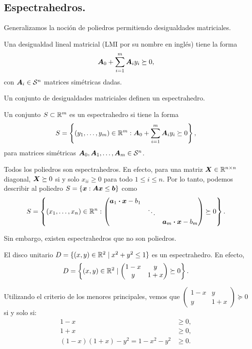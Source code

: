 \subsection{Espectrahedros.} Generalizamos la noción de poliedros permitiendo desigualdades matriciales.

\begin{definition}
  Una desigualdad lineal matricial (LMI por su nombre en inglés) tiene la forma
  $$\bm{A}_0 + \sum_{i = 1}^m \bm{A}_i y_i \succeq 0,$$
  con $\bm{A}_i \in {\mathcal S}^n$ matrices simétricas dadas.
\end{definition}

Un conjunto de desigualdades matriciales definen un espectrahedro.

\begin{definition}
Un conjunto $S \subset \mathbb{R}^m$ es un espectrahedro si tiene la forma
$$
S = \left\{ (y_1, \dots, y_m) \in \mathbb{R}^m : \bm{A}_0 + \sum_{i = 1}^m \bm{A}_i y_i \succeq 0\right\},
$$
para matrices simétricas $\bm{A}_0, \bm{A}_1, \dots, \bm{A}_m \in {\mathcal S}^n$.
\end{definition}

\begin{example}
Todos los poliedros son espectrahedros. En efecto, para una matriz $\bm{X} \in \mathbb{R}^{n\times n}$ diagonal, $\bm{X} \succeq 0$ si y solo $x_{ii} \ge 0$ para todo $1 \le i \le n$. Por lo tanto, podemos describir al poliedro $S = \{\bm{x}: \bm{A} \bm{x} \le \bm{b}\}$ como
$$
S = \left\{ (x_1, \dots, x_n) \in \mathbb{R}^n : \begin{pmatrix} \bm{a}_1 \boldsymbol{\cdot} \bm{x} - b_1 & & \\ & \ddots & \\ & & \bm{a}_m \boldsymbol{\cdot} \bm{x} - b_m \end{pmatrix} \succeq 0\right\}.
$$
\end{example}

Sin embargo, existen espectrahedros que no son poliedros.

\begin{example}
El disco unitario $D = \{(x,y) \in \mathbb{R}^2 \mid x^2 + y^2 \le 1\}$ es un espectrahedro. En efecto,
$$
D = \left\{(x,y) \in \mathbb{R}^2 \mid \begin{pmatrix} 1-x & y \\ y & 1+x \end{pmatrix} \succeq 0\right\}.
$$

Utilizando el criterio de los menores principales, vemos que $\begin{pmatrix} 1-x & y \\ y & 1+x \end{pmatrix} \succeq 0$ si y solo si:
$$
\begin{aligned}
1-x &\ge 0, \\
1+x &\ge 0, \\
(1-x)(1+x)-y^2 = 1 - x^2 - y^2 &\ge 0.
\end{aligned}
$$
\end{example}


